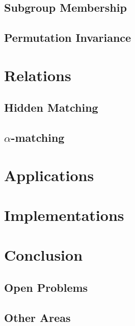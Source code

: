 \documentclass[a4paper]{article}
\begin{document}
        \subsection{Subgroup Membership}
        
        \subsection{Permutation Invariance}
        
    \section{Relations}
    
        \subsection{Hidden Matching}
        
        \subsection{$\alpha$-matching}
        
    \section{Applications}
    
    \section{Implementations}
    
    \section{Conclusion}
    
        \subsection{Open Problems}
        
        \subsection{Other Areas}
\end{document}
